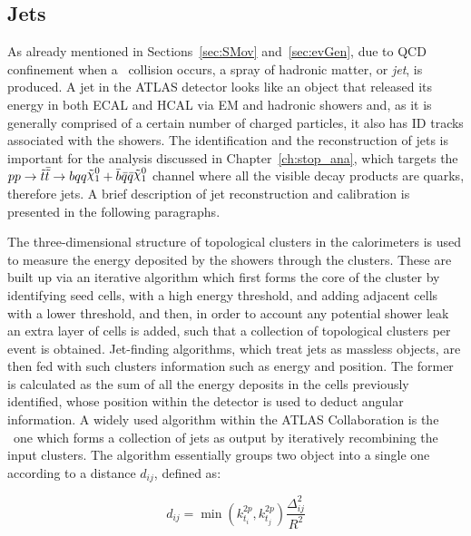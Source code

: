 		\subsection*{Jets}

			As already mentioned in Sections~\ref{sec:SMov} and~\ref{sec:evGen}, due to \ac{QCD} confinement when a \pp\ collision occurs, a spray of hadronic matter, or \emph{jet}, is produced. A jet in the \ac{ATLAS} detector looks like an object that released its energy in both \ac{ECAL} and \ac{HCAL} via \ac{EM} and hadronic showers and, as it is generally comprised of a certain number of charged particles, it also has \ac{ID} tracks associated with the showers. The identification and the reconstruction of jets is important for the analysis discussed in Chapter~\ref{ch:stop_ana}, which targets the $pp \to \stop \bar{\stop} \to bqq \ninoone + \bar{b}\bar{q}\bar{q} \ninoone$ channel where all the visible decay products are quarks, therefore jets. A brief description of jet reconstruction and calibration is presented in the following paragraphs.


				The three-dimensional structure of topological clusters in the calorimeters is used to measure the energy deposited by the showers through the clusters\cite{LamplAlgo2008,Aad:2016upy}. These are built up via an iterative algorithm which first forms the core of the cluster by identifying seed cells, with a high energy threshold, and adding adjacent cells with a lower threshold, and then, in order to account any potential shower leak an extra layer of cells is added, such that a collection of topological clusters per event is obtained. Jet-finding algorithms, which treat jets as massless objects, are then fed with such clusters information such as energy and position. The former is calculated as the sum of all the energy deposits in the cells previously identified, whose position within the detector is used to deduct angular information. A widely used algorithm within the \ac{ATLAS} Collaboration is the \antikt\ one which forms a collection of jets as output by iteratively recombining the input clusters. The algorithm essentially groups two object into a single one according to a distance $d_{ij}$, defined as: 

				\begin{equation}
					d_{ij} = \min \left ( k_{t_{i}}^{2p}, k_{t_{j}}^{2p}\right ) \frac{\Delta_{ij}^2}{R^2}
				\label{eq:dij}
				\end{equation}
				
